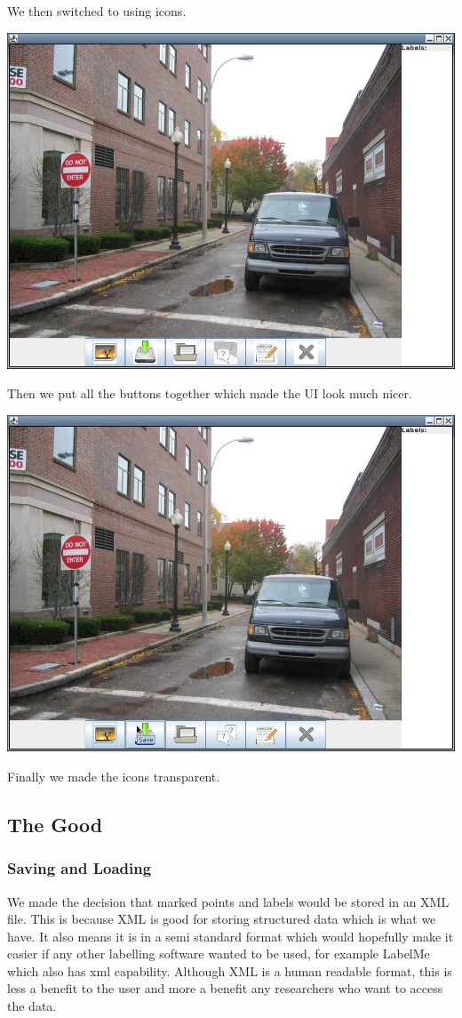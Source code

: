 \documentclass[a4paper,11pt,oneside]{article}
\begin{document}
We then switched to using icons.

\includegraphics[width=\textwidth]{old10.png}

Then we put all the buttons together which made the UI look much nicer.

\includegraphics[width=\textwidth]{old11.png}

Finally we made the icons transparent.

\subsection{The Good}

\subsubsection{Saving and Loading}
We made the decision that marked points and labels would be stored in an XML
file.  This is because XML is good for storing structured data which is what we
have.  It also means it is in a semi standard format which would hopefully make
it easier if any other labelling software wanted to be used, for example LabelMe
which also has xml capability.  Although XML is a human readable format, this is
less a benefit to the user and more a benefit any researchers who want to access
the data.
\end{document}
